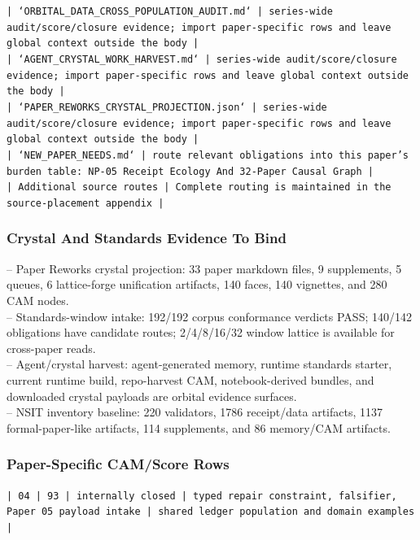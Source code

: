 \documentclass[11pt]{article}
\begin{document}
\noindent\texttt{| `ORBITAL\_DATA\_CROSS\_POPULATION\_AUDIT.md` | series-wide audit/score/closure evidence; import paper-specific rows and leave global context outside the body |}\\
\noindent\texttt{| `AGENT\_CRYSTAL\_WORK\_HARVEST.md` | series-wide audit/score/closure evidence; import paper-specific rows and leave global context outside the body |}\\
\noindent\texttt{| `PAPER\_REWORKS\_CRYSTAL\_PROJECTION.json` | series-wide audit/score/closure evidence; import paper-specific rows and leave global context outside the body |}\\
\noindent\texttt{| `NEW\_PAPER\_NEEDS.md` | route relevant obligations into this paper's burden table: NP-05 Receipt Ecology And 32-Paper Causal Graph |}\\
\noindent\texttt{| Additional source routes | Complete routing is maintained in the source-placement appendix |}\\

\subsubsection*{Crystal And Standards Evidence To Bind}

\noindent{}-- Paper Reworks crystal projection: 33 paper markdown files, 9 supplements, 5 queues, 6 lattice-forge unification artifacts, 140 faces, 140 vignettes, and 280 CAM nodes.\\
\noindent{}-- Standards-window intake: 192/192 corpus conformance verdicts PASS; 140/142 obligations have candidate routes; 2/4/8/16/32 window lattice is available for cross-paper reads.\\
\noindent{}-- Agent/crystal harvest: agent-generated memory, runtime standards starter, current runtime build, repo-harvest CAM, notebook-derived bundles, and downloaded crystal payloads are orbital evidence surfaces.\\
\noindent{}-- NSIT inventory baseline: 220 validators, 1786 receipt/data artifacts, 1137 formal-paper-like artifacts, 114 supplements, and 86 memory/CAM artifacts.\\

\subsubsection*{Paper-Specific CAM/Score Rows}

\noindent\texttt{| 04 | 93 | internally closed | typed repair constraint, falsifier, Paper 05 payload intake | shared ledger population and domain examples |}\\
\end{document}
